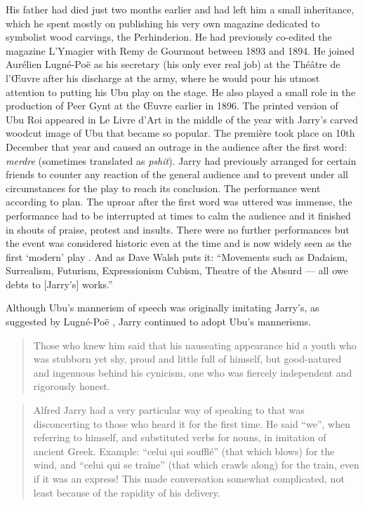 His father had died just two months earlier and had left him a small inheritance, which he spent mostly on publishing his very own magazine dedicated to symbolist wood carvings, the Perhinderion. He had previously co-edited the magazine L'Ymagier with Remy de Gourmont between 1893 and 1894. He joined Aurélien Lugné-Poë as his secretary (his only ever real job) at the Théâtre de l'Œuvre after his discharge at the army, where he would pour his utmost attention to putting his Ubu play on the stage. He also played a small role in the production of Peer Gynt at the Œuvre earlier in 1896. The printed version of Ubu Roi appeared in Le Livre d'Art in the middle of the year with Jarry's carved woodcut image of Ubu that became so popular. The première took place on 10th December that year and caused an outrage in the audience after the first word: \emph{merdre} (sometimes translated as \emph{pshit}). Jarry had previously arranged for certain friends to counter any reaction of the general audience and to prevent under all circumstances for the play to reach its conclusion. The performance went according to plan. The uproar after the first word was uttered was immense, the performance had to be interrupted at times to calm the audience and it finished in shouts of praise, protest and insults. There were no further performances but the event was considered historic even at the time and is now widely seen as the first `modern' play \autocite[p.168-169]{Brotchie2011a}. And as Dave Walsh puts it: ``Movements such as Dadaism, Surrealism, Futurism, Expressionism Cubism, Theatre of the Absurd --- all owe debts to [Jarry's] works.'' \autocite*{Walsh2001}

Although Ubu's mannerism of speech was originally imitating Jarry's, as suggested by Lugné-Poë \autocite[p.155]{Brotchie2011a}, Jarry continued to adopt Ubu's mannerisms.

\begin{quotation}
  Those who knew him said that his nauseating appearance hid a youth who was stubborn yet shy, proud and little full of himself, but good-natured and ingenuous behind his cynicism, one who was fiercely independent and rigorously honest. 
\end{quotation}

\begin{quotation}
  Alfred Jarry had a very particular way of speaking to that was disconcerting to those who heard it for the first time. He said ``we'', when referring to himself, and substituted verbs for nouns, in imitation of ancient Greek. Example: ``celui qui soufflé'' (that which blows) for the wind, and ``celui qui se traîne'' (that which crawls along) for the train, even if it was an express! This made conversation somewhat complicated, not least because of the rapidity of his delivery. 
\end{quotation}

